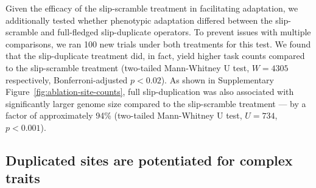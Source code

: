 Given the efficacy of the slip-scramble treatment in facilitating adaptation, we additionally tested whether phenotypic adaptation differed between the slip-scramble and full-fledged slip-duplicate operators.
To prevent issues with multiple comparisons, we ran 100 new trials under both treatments for this test.
We found that the slip-duplicate treatment did, in fact, yield higher task counts compared to the slip-scramble treatment (two-tailed Mann-Whitney U test, $W = 4305$ respectively, Bonferroni-adjusted $p < 0.02$).
As shown in Supplementary Figure~\ref{fig:ablation-site-counts}, full slip-duplication was also associated with significantly larger genome size compared to the slip-scramble treatment --- by a factor of approximately 94\% (two-tailed Mann-Whitney U test, $U = 734$, $p < 0.001$).






\subsection{Duplicated sites are potentiated for complex traits}

